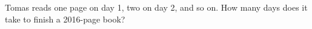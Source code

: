 Tomas reads one page on day 1, two on day 2, and so on. How many days does it take to finish a 2016-page book?
